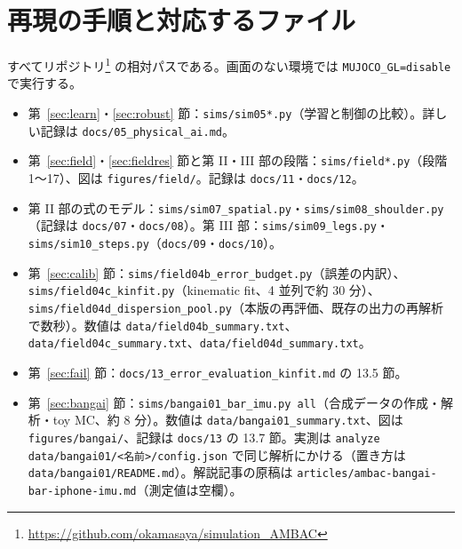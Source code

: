 \documentclass[paper=a4paper,fontsize=10pt,twocolumn,column_gap=2zw,line_length=24zw,number_of_lines=46,head_space=20mm]{jlreq}
\newcommand{\repo}{https://github.com/okamasaya/simulation_AMBAC}
\begin{document}
\section{再現の手順と対応するファイル}
\small
すべてリポジトリ\footnote{\url{\repo}} の相対パスである。画面のない環境では \texttt{MUJOCO\_GL=disable} で実行する。
\begin{itemize}\setlength{\itemsep}{0pt}
\item 第~\ref{sec:learn}・\ref{sec:robust} 節：\texttt{sims/sim05*.py}（学習と制御の比較）。詳しい記録は \texttt{docs/05\_physical\_ai.md}。
\item 第~\ref{sec:field}・\ref{sec:fieldres} 節と第 II・III 部の段階：\texttt{sims/field*.py}（段階 1〜17）、図は \texttt{figures/field/}。記録は \texttt{docs/11}・\texttt{docs/12}。
\item 第 II 部の式のモデル：\texttt{sims/sim07\_spatial.py}・\texttt{sims/sim08\_shoulder.py}（記録は \texttt{docs/07}・\texttt{docs/08}）。第 III 部：\texttt{sims/sim09\_legs.py}・\texttt{sims/sim10\_steps.py}（\texttt{docs/09}・\texttt{docs/10}）。
\item 第~\ref{sec:calib} 節：\texttt{sims/field04b\_error\_budget.py}（誤差の内訳）、\texttt{sims/field04c\_kinfit.py}（kinematic fit、4 並列で約 30 分）、
\texttt{sims/field04d\_dispersion\_pool.py}（本版の再評価、既存の出力の再解析で数秒）。数値は \texttt{data/field04b\_summary.txt}、\texttt{data/field04c\_summary.txt}、\texttt{data/field04d\_summary.txt}。
\item 第~\ref{sec:fail} 節：\texttt{docs/13\_error\_evaluation\_kinfit.md} の 13.5 節。
\item 第~\ref{sec:bangai} 節：\texttt{sims/bangai01\_bar\_imu.py all}（合成データの作成・解析・toy MC、約 8 分）。数値は \texttt{data/bangai01\_summary.txt}、図は \texttt{figures/bangai/}、記録は \texttt{docs/13} の 13.7 節。実測は \texttt{analyze data/bangai01/<名前>/config.json} で同じ解析にかける（置き方は \texttt{data/bangai01/README.md}）。解説記事の原稿は \texttt{articles/ambac-bangai-bar-iphone-imu.md}（測定値は空欄）。
\end{itemize}
\end{document}
